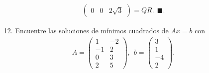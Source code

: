 \documentclass[11pt,letterpaper]{article}
\newcommand{\finf}{\blacksquare.}
\begin{document}
\begin{itemize}
\begin{align*}
\begin{pmatrix}
0 & 0 & 2\sqrt{3}
\end{pmatrix}=QR.\ \ \finf
\end{align*}
\item[12.] Encuentre las soluciones de mínimos cuadrados de $Ax=b$ con 
\begin{align*}
A=\begin{pmatrix}
 1 & -2\\
-1 &  2\\
 0 &  3\\
 2 &  5
\end{pmatrix}, \ \ b=\begin{pmatrix}
3\\ 1\\ -4\\2 
\end{pmatrix}.
\end{align*}


\end{itemize}
\end{document}
